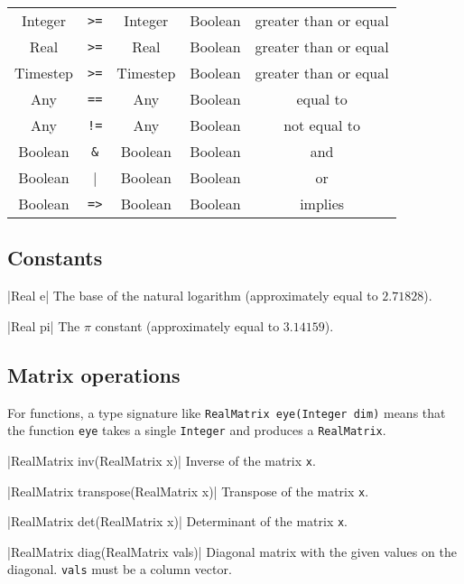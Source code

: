 \begin{table}[H]
\begin{tabular}{ c c c c c }
Integer & \verb|>=| & Integer & Boolean & greater than or equal \\
Real & \verb|>=| & Real & Boolean & greater than or equal \\
Timestep & \verb|>=| & Timestep & Boolean & greater than or equal \\

Any & \verb|==| & Any & Boolean & equal to \\

Any & \verb|!=| & Any & Boolean & not equal to \\

Boolean & \verb|&| & Boolean & Boolean & and \\

Boolean & \verb||| & Boolean & Boolean & or \\

Boolean & \verb|=>| & Boolean & Boolean & implies \\

\bottomrule
\end{tabular}
\end{table}


\subsection{Constants}
\label{sec:builtin-constants}

\blog|Real e|
\myindent The base of the natural logarithm (approximately equal to $2.71828$).

\blog|Real pi|
\myindent The $\pi$ constant (approximately equal to $3.14159$).


\subsection{Matrix operations}
\label{sec:builtin-matrix-ops}

For functions, a type signature like \verb|RealMatrix eye(Integer dim)| means
that the function \verb|eye| takes a single \verb|Integer| and produces a
\verb|RealMatrix|.

\blog|RealMatrix inv(RealMatrix x)|
\myindent Inverse of the matrix \verb|x|.

\blog|RealMatrix transpose(RealMatrix x)|
\myindent Transpose of the matrix \verb|x|.

\blog|RealMatrix det(RealMatrix x)|
\myindent Determinant of the matrix \verb|x|.

\blog|RealMatrix diag(RealMatrix vals)|
\myindent Diagonal matrix with the given values on the diagonal. \verb|vals|
must be a
column vector.

